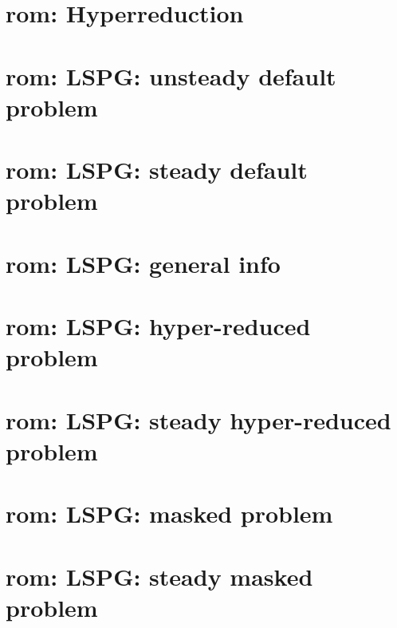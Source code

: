 \let\mypdfximage\pdfximage\def\pdfximage{\immediate\mypdfximage}\documentclass[twoside]{book}
\newcommand{\+}{\discretionary{\mbox{\scriptsize$\hookleftarrow$}}{}{}}
\begin{document}
\chapter{rom\+: Hyperreduction}
\label{md_pages_components_rom_hyperreduction}

\chapter{rom\+: LSPG\+: unsteady default problem}
\label{md_pages_components_rom_lspg_default}

\chapter{rom\+: LSPG\+: steady default problem}
\label{md_pages_components_rom_lspg_default_steady}

\chapter{rom\+: LSPG\+: general info}
\label{md_pages_components_rom_lspg_general}

\chapter{rom\+: LSPG\+: hyper-\/reduced problem}
\label{md_pages_components_rom_lspg_hypred}

\chapter{rom\+: LSPG\+: steady hyper-\/reduced problem}
\label{md_pages_components_rom_lspg_hypred_steady}

\chapter{rom\+: LSPG\+: masked problem}
\label{md_pages_components_rom_lspg_masked}

\chapter{rom\+: LSPG\+: steady masked problem}
\label{md_pages_components_rom_lspg_masked_steady}

\end{document}
